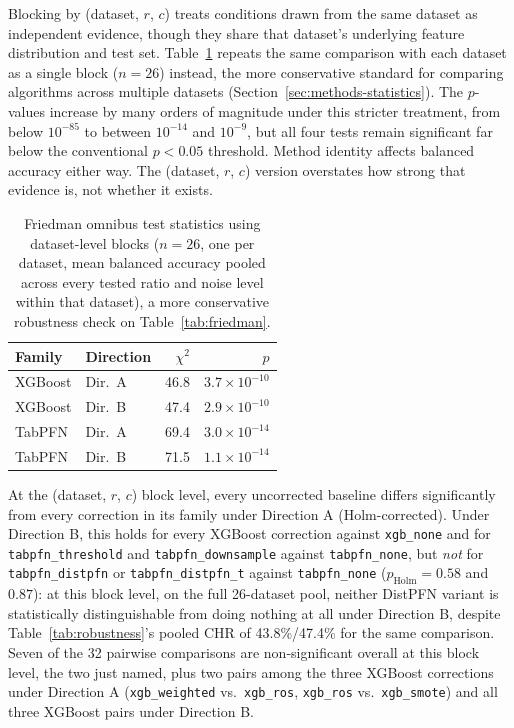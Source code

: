 Blocking by (dataset, $r$, $c$) treats conditions drawn from the same
dataset as independent evidence, though they share that dataset's
underlying feature distribution and test set. Table~\ref{tab:friedman-dataset}
repeats the same comparison with each dataset as a single block ($n{=}26$)
instead, the more conservative standard for comparing algorithms across
multiple datasets (Section~\ref{sec:methods-statistics}). The $p$-values
increase by many orders of magnitude under this stricter treatment, from
below $10^{-85}$ to between $10^{-14}$ and $10^{-9}$, but all four tests
remain significant far below the conventional $p<0.05$ threshold. Method
identity affects balanced accuracy either way. The (dataset, $r$, $c$)
version overstates how strong that evidence is, not whether it exists.

\begin{table}[t]
\centering
\caption{Friedman omnibus test statistics using dataset-level blocks
($n{=}26$, one per dataset, mean balanced accuracy pooled across every
tested ratio and noise level within that dataset), a more conservative
robustness check on Table~\ref{tab:friedman}.}
\label{tab:friedman-dataset}
\begin{tabular}{@{}llrr@{}}
\toprule
Family & Direction & $\chi^2$ & $p$ \\
\midrule
XGBoost & Dir.\ A & 46.8 & $3.7\times10^{-10}$ \\
XGBoost & Dir.\ B & 47.4 & $2.9\times10^{-10}$ \\
TabPFN  & Dir.\ A & 69.4 & $3.0\times10^{-14}$ \\
TabPFN  & Dir.\ B & 71.5 & $1.1\times10^{-14}$ \\
\bottomrule
\end{tabular}
\end{table}

At the (dataset, $r$, $c$) block level, every uncorrected baseline
differs significantly from every correction in its family under Direction
A (Holm-corrected). Under Direction B, this holds for every XGBoost
correction against \texttt{xgb\_none} and for \texttt{tabpfn\_threshold}
and \texttt{tabpfn\_downsample} against \texttt{tabpfn\_none}, but
\emph{not} for \texttt{tabpfn\_distpfn} or \texttt{tabpfn\_distpfn\_t}
against \texttt{tabpfn\_none} ($p_{\text{Holm}}=0.58$ and $0.87$): at this
block level, on the full 26-dataset pool, neither DistPFN variant is
statistically distinguishable from doing nothing at all under Direction
B, despite Table~\ref{tab:robustness}'s pooled CHR of 43.8\%/47.4\% for
the same comparison. Seven of the 32 pairwise comparisons are
non-significant overall at this block level, the two just named, plus
two pairs among the three XGBoost corrections under Direction A
(\texttt{xgb\_weighted} vs.\ \texttt{xgb\_ros}, \texttt{xgb\_ros} vs.\
\texttt{xgb\_smote}) and all three XGBoost pairs under Direction B.

